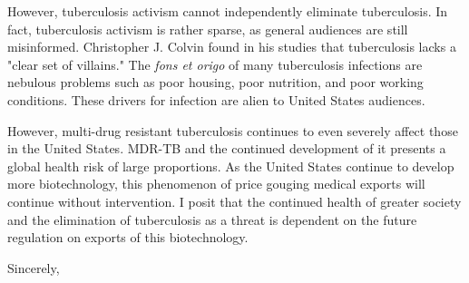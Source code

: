 \documentclass[10pt]{letter}
\begin{document}
\begin{letter}
However, tuberculosis activism cannot independently eliminate tuberculosis. In
fact, tuberculosis activism is rather sparse, as general audiences are still
misinformed. Christopher J. Colvin found in his studies that tuberculosis lacks
a "clear set of villains." The  \textit{fons et origo} of many tuberculosis
infections are nebulous problems such as poor housing, poor nutrition, and poor
working conditions. These drivers for infection are alien to United States
audiences.

However, multi-drug resistant tuberculosis continues to even severely affect
those in the United States. MDR-TB and the continued development of it presents
a global health risk of large proportions. As the United States continue to
develop more biotechnology, this phenomenon of price gouging medical exports
will continue without intervention. I posit that the continued health of greater
society and the elimination of tuberculosis as a threat is dependent on the
future regulation on exports of this biotechnology.

\closing{Sincerely,}

\end{letter}
\end{document}
